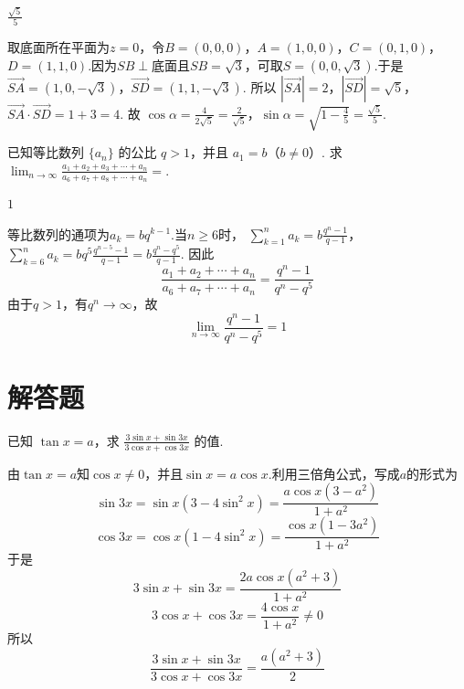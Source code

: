 \documentclass[UTF8,a4paper,oneside,11pt]{ctexbook}
\begin{document}
\begin{answer}
\(\frac{\sqrt{5}}{5}\)
\end{answer}

\begin{solution}
取底面所在平面为\(z=0\)，令\(B=(0,0,0)\)，\(A=(1,0,0)\)，\(C=(0,1,0)\)，\(D=(1,1,0)\).因为\(SB\perp\)底面且\(SB=\sqrt3\)，可取\(S=(0,0,\sqrt3)\).于是
\(\overrightarrow{SA}=(1,0,-\sqrt3)\)，\(\overrightarrow{SD}=(1,1,-\sqrt3)\).
所以
\(|\overrightarrow{SA}|=2\)，\(|\overrightarrow{SD}|=\sqrt5\)，\(\overrightarrow{SA}\cdot\overrightarrow{SD}=1+3=4\).
故
\(\cos\alpha=\frac{4}{2\sqrt5}=\frac{2}{\sqrt5}\)，\(\sin\alpha=\sqrt{1-\frac45}=\frac{\sqrt5}{5}\).
\end{solution}

\begin{problem}

已知等比数列 \(\{a_{n}\}\) 的公比 \(q > 1\)，并且 \(a_{1} = b\)（\(b \neq 0\)）. 求 \(\displaystyle\lim_{n \to \infty} \frac{a_{1} + a_{2} + a_{3} + \cdots + a_{n}}{a_{6} + a_{7} + a_{8} + \cdots + a_{n}}=\)\fillinblank{}.
\end{problem}

\begin{answer}
\(1\)
\end{answer}

\begin{solution}
等比数列的通项为\(a_k=bq^{k-1}\).当\(n\ge6\)时，
\(\sum_{k=1}^{n}a_k=b\frac{q^n-1}{q-1}\)，\(\sum_{k=6}^{n}a_k=bq^5\frac{q^{n-5}-1}{q-1}=b\frac{q^n-q^5}{q-1}\).
因此
\[
\frac{a_1+a_2+\cdots+a_n}{a_6+a_7+\cdots+a_n}
=\frac{q^n-1}{q^n-q^5}
\]
由于\(q>1\)，有\(q^n\to\infty\)，故
\[
\lim_{n\to\infty}\frac{q^n-1}{q^n-q^5}=1
\]
\end{solution}

\section{解答题}

\begin{problem}

已知 \(\tan x = a\)，求 \(\frac{3\sin x + \sin 3x}{3\cos x + \cos 3x}\) 的值.
\end{problem}

\begin{solution}
由\(\tan x=a\)知\(\cos x\ne0\)，并且\(\sin x=a\cos x\).利用三倍角公式，写成\(a\)的形式为
\[
\sin3x=\sin x(3-4\sin^2x)
=\frac{a\cos x(3-a^2)}{1+a^2}
\]
\[
\cos3x=\cos x(1-4\sin^2x)
=\frac{\cos x(1-3a^2)}{1+a^2}
\]
于是
\[
3\sin x+\sin3x
=\frac{2a\cos x(a^2+3)}{1+a^2}
\]
\[
3\cos x+\cos3x
=\frac{4\cos x}{1+a^2}\ne0
\]
所以
\[
\frac{3\sin x+\sin3x}{3\cos x+\cos3x}
=\frac{a(a^2+3)}{2}
\]
\end{solution}
\end{document}
